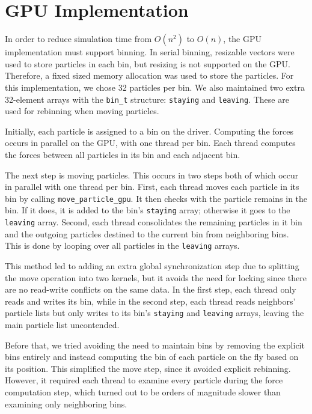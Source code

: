 \documentclass[12pt]{article}
\begin{document}



\section{GPU Implementation} \label{GPU}

In order to reduce simulation time from $O(n^2)$ to $O(n)$, the GPU implementation must support binning. In serial binning, resizable vectors were used to store particles in each bin, but resizing is not supported on the GPU. Therefore, a fixed sized memory allocation was used to store the particles. For this implementation, we chose 32 particles per bin. We also maintained two extra 32-element arrays with the \texttt{bin\_t} structure: \texttt{staying} and \texttt{leaving}. These are used for rebinning when moving particles.

Initially, each particle is assigned to a bin on the driver. Computing the forces occurs in parallel on the GPU, with one thread per bin. Each thread computes the forces between all particles in its bin and each adjacent bin.

The next step is moving particles. This occurs in two steps both of which occur in parallel with one thread per bin. First, each thread moves each particle in its bin by calling \texttt{move\_particle\_gpu}. It then checks with the particle remains in the bin. If it does, it is added to the bin's \texttt{staying} array; otherwise it goes to the \texttt{leaving} array. Second, each thread consolidates the remaining particles in it bin and the outgoing particles destined to the current bin from neighboring bins. This is done by looping over all particles in the \texttt{leaving} arrays.

This method led to adding an extra global synchronization step due to splitting the move operation into two kernels, but it avoids the need for locking since there are no read-write conflicts on the same data. In the first step, each thread only reads and writes its bin, while in the second step, each thread reads neighbors' particle lists but only writes to its bin's \texttt{staying} and \texttt{leaving} arrays, leaving the main particle list uncontended.

Before that, we tried avoiding the need to maintain bins by removing the explicit bins entirely and instead computing the bin of each particle on the fly based on its position. This simplified the move step, since it avoided explicit rebinning. However, it required each thread to examine every particle during the force computation step, which turned out to be orders of magnitude slower than examining only neighboring bins.
\end{document}
